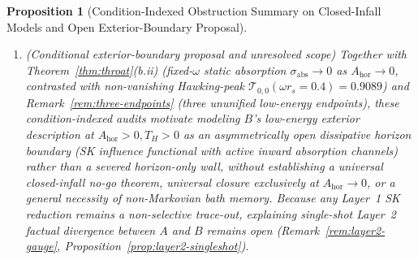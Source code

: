 \documentclass[11pt,a4paper]{article}
\newtheorem{proposition}{Proposition}
\theoremstyle{definition}
\theoremstyle{remark}
\newcommand{\cT}{\mathcal{T}}
\newcommand{\1}{\mathbf{1}}
\begin{document}
\begin{proposition}[Condition-Indexed Obstruction Summary on Closed-Infall Models and Open Exterior-Boundary Proposal]
\begin{enumerate}
\begin{enumerate}
  \end{enumerate}
  \item[(III)] \emph{(Conditional exterior-boundary proposal and unresolved scope)} Together with Theorem~\ref{thm:throat}(b.ii) (fixed-$\omega$ static absorption $\sigma_{\mathrm{abs}}\to 0$ as $A_{\mathrm{hor}}\to 0$, contrasted with non-vanishing Hawking-peak $\cT_{0,0}(\omega r_s=0.4)=0.9089$) and Remark~\ref{rem:three-endpoints} (three ununified low-energy endpoints), these condition-indexed audits motivate modeling $B$'s low-energy exterior description at $A_{\mathrm{hor}}>0, T_H>0$ as an \emph{asymmetrically open dissipative horizon boundary} (SK influence functional with active inward absorption channels) rather than a severed horizon-only wall, without establishing a universal closed-infall no-go theorem, universal closure exclusively at $A_{\mathrm{hor}}\to 0$, or a general necessity of non-Markovian bath memory. Because any Layer~1 SK reduction remains a non-selective trace-out, explaining single-shot Layer~2 factual divergence between $A$ and $B$ remains open (Remark~\ref{rem:layer2-gauge}, Proposition~\ref{prop:layer2-singleshot}).
\end{enumerate}
\end{proposition}
\end{document}
